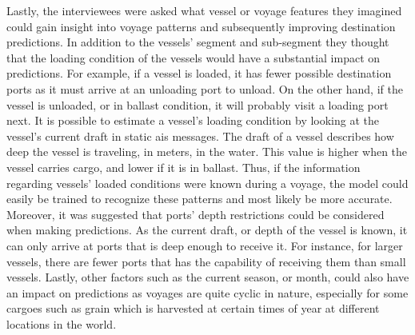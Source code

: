 Lastly, the interviewees were asked what vessel or voyage features they imagined could gain insight into voyage patterns and subsequently improving destination predictions. In addition to the vessels' segment and sub-segment they thought that the loading condition of the vessels would have a substantial impact on predictions. For example, if a vessel is loaded, it has fewer possible destination ports as it must arrive at an unloading port to unload. On the other hand, if the vessel is unloaded, or in ballast condition, it will probably visit a loading port next. It is possible to estimate a vessel's loading condition by looking at the vessel's current draft in static \acrshort{ais} messages. The draft of a vessel describes how deep the vessel is traveling, in meters, in the water. This value is higher when the vessel carries cargo, and lower if it is in ballast. Thus, if the information regarding vessels' loaded conditions were known during a voyage, the model could easily be trained to recognize these patterns and most likely be more accurate. Moreover, it was suggested that ports' depth restrictions could be considered when making predictions. As the current draft, or depth of the vessel is known, it can only arrive at ports that is deep enough to receive it. For instance, for larger vessels, there are fewer ports that has the capability of receiving them than small vessels. Lastly, other factors such as the current season, or month, could also have an impact on predictions as voyages are quite cyclic in nature, especially for some cargoes such as grain which is harvested at certain times of year at different locations in the world.
